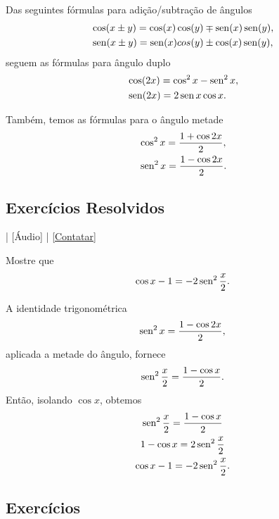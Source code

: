 Das seguintes fórmulas para adição/subtração de ângulos
\begin{align}
  &\cos(x\pm y) = \cos(x)\cos(y) \mp \operatorname{sen}(x)\operatorname{sen}(y),\\
  &\operatorname{sen}(x\pm y) = \operatorname{sen}(x)cos(y) \pm \cos(x)\operatorname{sen}(y),
\end{align}
seguem as fórmulas para ângulo duplo
\begin{align}
  &\cos(2x) = \cos^2x - \operatorname{sen}^2x,\\
  &\operatorname{sen}(2x) = 2\operatorname{sen} x\cos x.
\end{align}

Também, temos as fórmulas para o ângulo metade
\begin{align}
  &\cos^2 x = \frac{1 + \cos 2x}{2},\\
  &\operatorname{sen}^2 x = \frac{1 - \cos 2x}{2}.\label{eq:id_trig_cos_x2}
\end{align}

\subsection*{Exercícios Resolvidos}

\begin{flushright}
  [Vídeo] | [Áudio] | \href{https://phkonzen.github.io/notas/contato.html}{[Contatar]}
\end{flushright}

\begin{exeresol}
  Mostre que
  \begin{equation}
    \cos x - 1 = -2\operatorname{sen}^2 \frac{x}{2}.
  \end{equation}
\end{exeresol}
\begin{resol}
  A identidade trigonométrica
  \begin{equation}
    \operatorname{sen}^2 x = \frac{1 - \cos 2x}{2},
  \end{equation}
  aplicada a metade do ângulo, fornece
  \begin{equation}
    \operatorname{sen}^2 \frac{x}{2} = \frac{1 - \cos x}{2}.
  \end{equation}
  Então, isolando $\cos x$, obtemos
  \begin{gather}
    \operatorname{sen}^2 \frac{x}{2} = \frac{1 - \cos x}{2}\\
    1 - \cos x = 2\operatorname{sen}^2 \frac{x}{2}\\
    \cos x - 1 = -2\operatorname{sen}^2 \frac{x}{2}.
  \end{gather}
\end{resol}

\subsection*{Exercícios}

